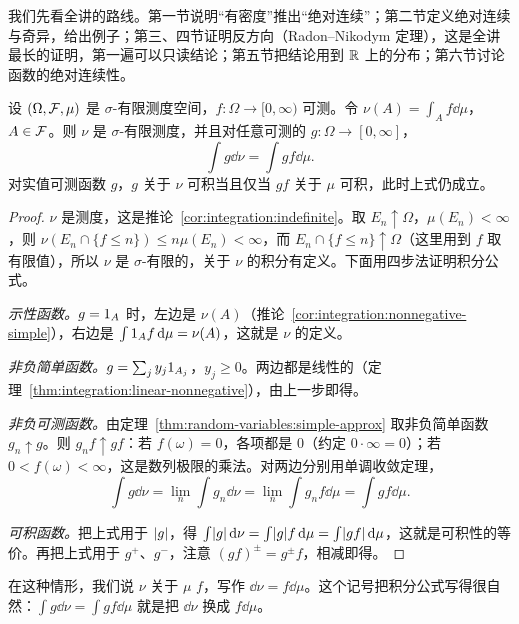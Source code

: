 我们先看全讲的路线。第一节说明“有密度”推出“绝对连续”；第二节定义绝对连续与奇异，给出例子；第三、四节证明反方向（Radon--Nikodym 定理），这是全讲最长的证明，第一遍可以只读结论；第五节把结论用到 $\mathbb{R}$ 上的分布；第六节讨论函数的绝对连续性。


\begin{proposition}\label{prop:ac:density-measure}
设 $(\Omega,\mathcal{F},\mu)$ 是 $\sigma$-有限测度空间，$f:\Omega\to[0,\infty)$ 可测。令 $\nu(A)=\int_Af\dd\mu$，$A\in\mathcal{F}$。则 $\nu$ 是 $\sigma$-有限测度，并且对任意可测的 $g:\Omega\to[0,\infty]$，
\[
\int g\dd\nu=\int gf\dd\mu .
\]
对实值可测函数 $g$，$g$ 关于 $\nu$ 可积当且仅当 $gf$ 关于 $\mu$ 可积，此时上式仍成立。
\end{proposition}
\begin{proof}
$\nu$ 是测度，这是推论~\ref{cor:integration:indefinite}。取 $E_n\uparrow\Omega$，$\mu(E_n)<\infty$，则 $\nu(E_n\cap\{f\leqslant n\})\leqslant n\mu(E_n)<\infty$，而 $E_n\cap\{f\leqslant n\}\uparrow\Omega$（这里用到 $f$ 取有限值），所以 $\nu$ 是 $\sigma$-有限的，关于 $\nu$ 的积分有定义。下面用四步法证明积分公式。

\emph{示性函数。}$g=1_A$ 时，左边是 $\nu(A)$（推论~\ref{cor:integration:nonnegative-simple}），右边是 $\int1_Af\,\mathrm{d}\mu=\nu(A)$，这就是 $\nu$ 的定义。

\emph{非负简单函数。}$g=\sum_jy_j1_{A_j}$，$y_j\geqslant0$。两边都是线性的（定理~\ref{thm:integration:linear-nonnegative}），由上一步即得。

\emph{非负可测函数。}由定理~\ref{thm:random-variables:simple-approx} 取非负简单函数 $g_n\uparrow g$。则 $g_nf\uparrow gf$：若 $f(\omega)=0$，各项都是 $0$（约定 $0\cdot\infty=0$）；若 $0<f(\omega)<\infty$，这是数列极限的乘法。对两边分别用单调收敛定理，
\[
\int g\dd\nu=\lim_n\int g_n\dd\nu=\lim_n\int g_nf\dd\mu=\int gf\dd\mu .
\]

\emph{可积函数。}把上式用于 $\lvert g\rvert$，得 $\int\lvert g\rvert\,\mathrm{d}\nu=\int\lvert g\rvert f\,\mathrm{d}\mu=\int\lvert gf\rvert\,\mathrm{d}\mu$，这就是可积性的等价。再把上式用于 $g^+$、$g^-$，注意 $(gf)^\pm=g^\pm f$，相减即得。
\end{proof}

在这种情形，我们说 $\nu$ 关于 $\mu$  $f$，写作 $\dd\nu=f\dd\mu$。这个记号把积分公式写得很自然：$\int g\dd\nu=\int gf\dd\mu$ 就是把 $\dd\nu$ 换成 $f\dd\mu$。

